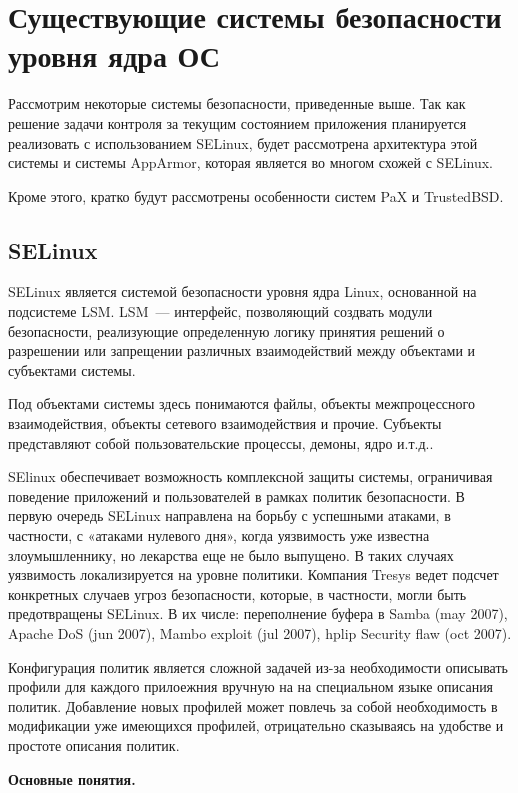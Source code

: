 \section{Существующие системы безопасности уровня ядра ОС}

\bigskip
Рассмотрим некоторые системы безопасности, 
приведенные выше. 
Так как решение задачи контроля за 
текущим состоянием приложения планируется
реализовать с использованием SELinux, 
будет рассмотрена архитектура этой системы 
и системы AppArmor, которая является во 
многом схожей с SELinux. 

Кроме этого, кратко будут рассмотрены особенности 
систем PaX и TrustedBSD.

\bigskip
\subsection{SELinux} 
SELinux является системой безопасности 
уровня ядра Linux, основанной на 
подсистеме LSM. LSM~--- интерфейс, позволяющий 
создвать модули безопасности, реализующие
определенную логику принятия решений о 
разрешении или запрещении различных 
взаимодействий между объектами и субъектами 
системы. 

Под объектами системы здесь 
понимаются файлы, объекты межпроцессного 
взаимодействия, объекты сетевого взаимодействия 
и прочие. Субъекты представляют собой 
пользовательские процессы, демоны, ядро и.т.д..

SElinux обеспечивает возможность 
комплексной защиты системы, ограничивая поведение 
приложений и пользователей в рамках политик 
безопасности. В первую очередь SELinux 
направлена на борьбу с успешными атаками, 
в частности, с «атаками нулевого дня», когда 
уязвимость уже известна злоумышленнику, 
но лекарства еще не было выпущено. В таких 
случаях уязвимость локализируется на уровне 
политики. Компания Tresys ведет подсчет 
конкретных случаев угроз безопасности, которые, 
в частности, могли быть предотвращены SELinux. 
В их числе: переполнение буфера в Samba (may 
2007), Apache DoS (jun 2007), Mambo exploit (jul 
2007), hplip Security flaw (oct 2007). 

Конфигурация политик является 
сложной задачей из-за необходимости
описывать профили для каждого прилоежния 
вручную на на специальном языке описания
политик. Добавление новых профилей может повлечь 
за собой необходимость в модификации уже имеющихся 
профилей, отрицательно сказываясь на удобстве и 
простоте описания политик. 

\bigskip
{\bfseries Основные понятия. }

